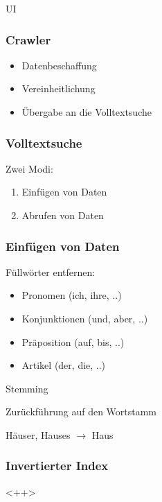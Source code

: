 \documentclass{beamer}
\begin{document}
\begin{frame}
  \begin{center}
    {\Huge UI}
  \end{center}
\end{frame}

\begin{frame}
  \frametitle{Crawler}

  \begin{itemize}
    \item Datenbeschaffung
    \item Vereinheitlichung
    \item Übergabe an die Volltextsuche
  \end{itemize}
\end{frame}

\begin{frame}
  \frametitle{Volltextsuche}

  Zwei Modi:
  \begin{enumerate}
    \item Einfügen von Daten
    \item Abrufen von Daten
  \end{enumerate}
\end{frame}

\begin{frame}[allowframebreaks]
  \frametitle{Einfügen von Daten}

  Füllwörter entfernen:

  \begin{itemize}
    \item Pronomen (ich, ihre, ..)
    \item Konjunktionen (und, aber, ..)
    \item Präposition (auf, bis, ..)
    \item Artikel (der, die, ..)
  \end{itemize}

  \break

  Stemming

  \bigskip

  Zurückführung auf den Wortstamm

  \medskip

  Häuser, Hauses $\rightarrow$ Haus
\end{frame}

\begin{frame}
  \frametitle{Invertierter Index}

  <++>
\end{frame}
\end{document}
